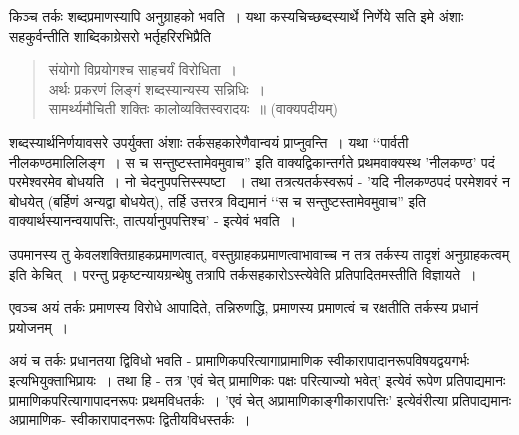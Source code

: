 {किञ्च तर्कः शब्दप्रमाणस्यापि अनुग्राहको भवति~। यथा कस्यचिच्छब्दस्यार्थे निर्णेये सति इमे अंशाः सहकुर्वन्तीति शाब्दिकाग्रेसरो भर्तृहरिरभिप्रैति 
\begin{verse}
संयोगो विप्रयोगश्च साहचर्यं विरोधिता~। \\
अर्थः प्रकरणं लिङ्गं शब्दस्यान्यस्य सन्निधिः~। \\
सामर्थ्यमौचिती शक्तिः कालोव्यक्तिस्वरादयः~॥ (वाक्यपदीयम्)
\end{verse}
शब्दस्यार्थनिर्णयावसरे उपर्युक्ता अंशाः तर्कसहकारेणैवान्वयं प्राप्नुवन्ति~। यथा ‘‘पार्वती नीलकण्ठमालिलिङ्ग~। स च सन्तुष्टस्तामेवमुवाच'' इति वाक्यद्विकान्तर्गते प्रथमवाक्यस्थ 'नीलकण्ठ' पदं परमेश्वरमेव बोधयति~। नो चेदनुपपत्तिस्स्पष्टा ~। तथा तत्रत्यतर्कस्वरूपं - 'यदि नीलकण्ठपदं परमेशवरं न बोधयेत् (बर्हिणं अन्यद्वा बोधयेत्), तर्हि उत्तरत्र विद्यमानं ‘‘स च सन्तुष्टस्तामेवमुवाच'' इति वाक्यार्थस्यानन्वयापत्तिः, तात्पर्यानुपपत्तिश्च' - इत्येवं भवति~। 

उपमानस्य तु केवलशक्तिग्राहकप्रमाणत्वात्, वस्तुग्राहकप्रमाणत्वाभावाच्च न तत्र तर्कस्य तादृशं अनुग्राहकत्वम् इति केचित्~। परन्तु प्रकृष्टन्यायग्रन्थेषु तत्रापि तर्कसहकारोऽस्त्येवेति प्रतिपादितमस्तीति विज्ञायते~। 

एवञ्च अयं तर्कः प्रमाणस्य विरोधे आपादिते, तन्निरुणद्धि, प्रमाणस्य प्रमाणत्वं च रक्षतीति तर्कस्य प्रधानं प्रयोजनम्~। 

अयं च तर्कः प्रधानतया द्विविधो भवति - प्रामाणिकपरित्यागाप्रामाणिक स्वीकारापादानरूपविषयद्वयगर्भः इत्यभियुक्ताभिप्रायः~। तथा हि - तत्र 'एवं चेत् प्रामाणिकः पक्षः परित्याज्यो भवेत्' इत्येवं रूपेण प्रतिपाद्यमानः प्रामाणिकपरित्यागापादनरूपः प्रथमविधतर्कः~। 'एवं चेत् अप्रामाणिकाङ्गीकारापत्तिः' इत्येवंरीत्या प्रतिपाद्यमानः अप्रामाणिक- स्वीकारापादनरूपः द्वितीयविधस्तर्कः~। 

}
